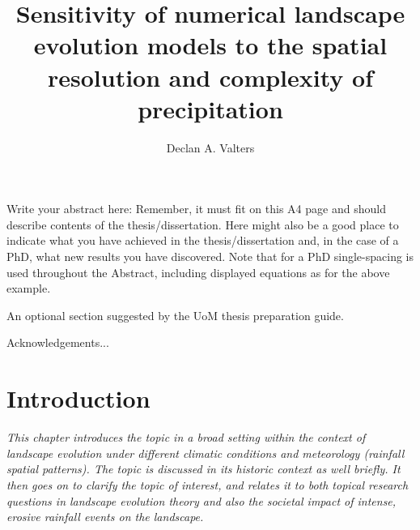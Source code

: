 \documentclass[12pt,oneside,PhD]{muthesis}
\begin{document}
\title{Sensitivity of numerical landscape evolution models to the spatial resolution and complexity of precipitation}

\author{Declan A. Valters}
\def\wordcount{xxxxx}




\beforeabstract

Write your abstract here: Remember, it must fit on this A4 page and should
describe contents of the thesis/dissertation. Here might also be a good place
to indicate what you have achieved in the thesis/dissertation and, in the
case of a PhD, what new results you have discovered. Note that for a PhD
single-spacing is used throughout the Abstract, including displayed equations
as for the above example.

\afterabstract

An optional section suggested by the UoM thesis preparation guide.

Acknowledgements...


\afterpreface



\chapter{Introduction}
\textit{This chapter introduces the topic in a broad setting within the context of landscape evolution under different climatic conditions and meteorology (rainfall spatial patterns). The topic is discussed in its historic context as well briefly. It then goes on to clarify the topic of interest, and relates it to both topical research questions in landscape evolution theory and also the societal impact of intense, erosive rainfall events on the landscape.}
\end{document}
